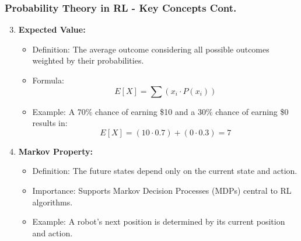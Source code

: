 \documentclass[aspectratio=169]{beamer}
\begin{document}
\begin{frame}[fragile]
    \frametitle{Probability Theory in RL - Key Concepts Cont.}
    \begin{enumerate}
        \setcounter{enumi}{2} %
        \item \textbf{Expected Value:}
            \begin{itemize}
                \item Definition: The average outcome considering all possible outcomes weighted by their probabilities.
                \item Formula: 
                    \[
                    E[X] = \sum (x_i \cdot P(x_i))
                    \]
                \item Example: A 70\% chance of earning \$10 and a 30\% chance of earning \$0 results in:
                    \[
                    E[X] = (10 \cdot 0.7) + (0 \cdot 0.3) = 7
                    \]
            \end{itemize}
        \item \textbf{Markov Property:}
            \begin{itemize}
                \item Definition: The future states depend only on the current state and action.
                \item Importance: Supports Markov Decision Processes (MDPs) central to RL algorithms.
                \item Example: A robot's next position is determined by its current position and action.
            \end{itemize}
    \end{enumerate}
\end{frame}
\end{document}
